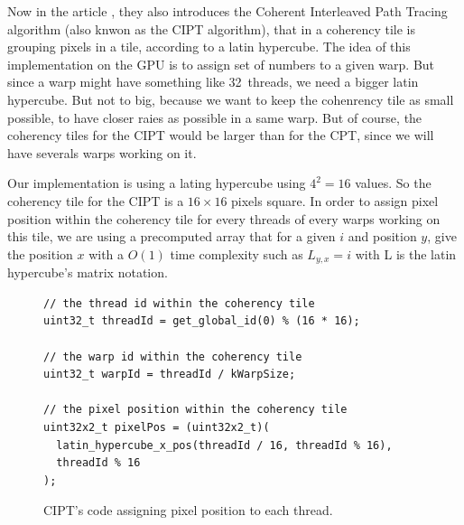 Now in the article \cite{cpt}, they also introduces the Coherent Interleaved Path
Tracing algorithm (also knwon as the CIPT algorithm), that in a coherency tile
is grouping pixels in a tile, according to a
latin hypercube. The idea of this implementation on the GPU is to assign set of
numbers to a given warp. But since a warp might have something like 32~threads,
we need a bigger latin hypercube. But not to big, because we want to keep the
cohenrency tile as small possible, to have closer raies as possible in a same
warp. But of course, the coherency tiles for the CIPT would be larger than for
the CPT, since we will have severals warps working on it.

Our implementation is using a lating hypercube using $4^2 = 16$ values. So the
coherency tile for the CIPT is a $16 \times 16$ pixels square. In order to assign
pixel position within the coherency tile for every threads of every warps
working on this tile, we are using a precomputed array that for a given $i$ and
position $y$, give the position $x$ with a $O(1)$ time complexity such as
$L_{y,x} = i$ with L is the latin hypercube's matrix notation.
\begin{figure}[H]
    \centering
    \begin{lstlisting}[morekeywords={uint32_t,uint32x2_t,get_global_id}]
// the thread id within the coherency tile
uint32_t threadId = get_global_id(0) % (16 * 16);

// the warp id within the coherency tile
uint32_t warpId = threadId / kWarpSize;

// the pixel position within the coherency tile
uint32x2_t pixelPos = (uint32x2_t)(
  latin_hypercube_x_pos(threadId / 16, threadId % 16),
  threadId % 16
);
    \end{lstlisting}
    \caption{CIPT's code assigning pixel position to each thread.}
    \label{code:cipt_pixel_pos}
\end{figure}


